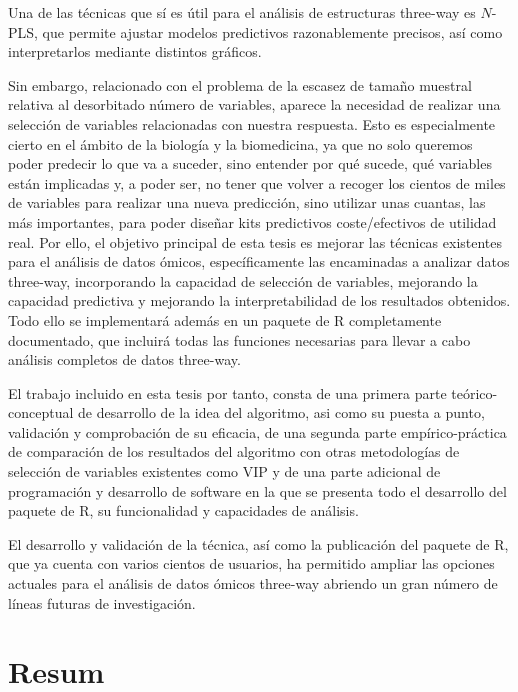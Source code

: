Una de las técnicas que sí es útil para el análisis de estructuras three-way es $N$-PLS, que permite ajustar modelos predictivos razonablemente precisos, así como interpretarlos mediante distintos gráficos.

Sin embargo, relacionado con el problema de la escasez de tamaño muestral relativa al desorbitado número de variables, aparece la necesidad de realizar una selección de variables relacionadas con nuestra respuesta. Esto es especialmente cierto en el ámbito de la biología y la biomedicina, ya que no solo queremos poder predecir lo que va a suceder, sino entender por qué sucede, qué variables están implicadas y, a poder ser, no tener que volver a recoger los cientos de miles de variables para realizar una nueva predicción, sino utilizar unas cuantas, las más importantes, para poder diseñar kits predictivos coste/efectivos de utilidad real. Por ello, el objetivo principal de esta tesis es mejorar las técnicas existentes para el análisis de datos ómicos, específicamente las encaminadas a analizar datos three-way, incorporando la capacidad de selección de variables, mejorando la capacidad predictiva y mejorando la interpretabilidad de los resultados obtenidos. Todo ello se implementará además en un paquete de R completamente documentado, que incluirá todas las funciones necesarias para llevar a cabo análisis completos de datos three-way. 

El trabajo incluido en esta tesis por tanto, consta de una primera parte teórico-conceptual de desarrollo de la idea del algoritmo, asi como su puesta a punto, validación y comprobación de su eficacia, de una segunda parte empírico-práctica de comparación de los resultados del algoritmo con otras metodologías de selección de variables existentes como VIP y de una parte adicional de programación y desarrollo de software en la que se presenta todo el desarrollo del paquete de R, su funcionalidad y capacidades de análisis. 

El desarrollo y validación de la técnica, así como la publicación del paquete de R, que ya cuenta con varios cientos de usuarios, ha permitido ampliar las opciones actuales para el análisis de datos ómicos three-way  abriendo un gran número de líneas futuras de investigación.


\ifEBOOKPDF
	\bigskip
\else
	\vfill
\fi


\chapter*{Resum}

